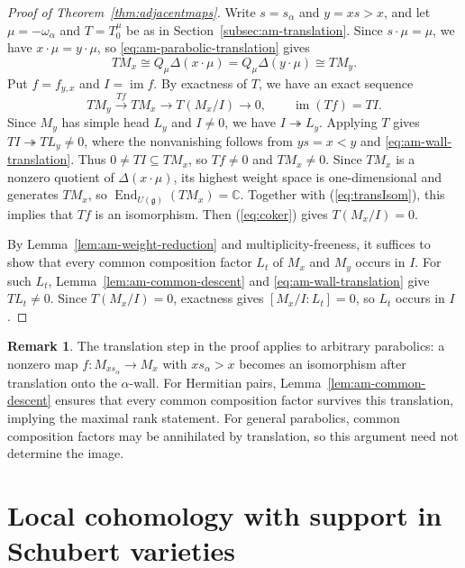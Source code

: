 \documentclass[12pt]{amsart}
\theoremstyle{definition}
\newtheorem{remark}[theorem]{Remark}
\numberwithin{equation}{section}
\newcommand{\g}{\mathfrak g}
\begin{document}
\begin{proof}[Proof of Theorem~\ref{thm:adjacentmaps}]
Write $s=s_\alpha$ and $y=xs>x$, and let $\mu=-\omega_\alpha$
and $T=T_0^\mu$ be as in Section~\ref{subsec:am-translation}.
Since $s\cdot\mu=\mu$, we have $x\cdot \mu=y\cdot \mu$, so \eqref{eq:am-parabolic-translation} gives
\begin{equation}\label{eq:transIsom}
 TM_x\cong Q_\mu\Delta(x\cdot\mu)
 =Q_\mu\Delta(y\cdot\mu)\cong TM_y.
\end{equation}
Put $f=f_{y,x}$ and $I=\operatorname{im}f$. By exactness of $T$,
we have an exact sequence
\begin{equation}\label{eq:coker}
TM_y\xrightarrow{Tf}TM_x\longrightarrow T(M_x/I)\longrightarrow0,
\qquad
\operatorname{im}(Tf)=TI.
\end{equation}
Since $M_y$ has simple head $L_y$ and $I\ne0$, we have
$I\twoheadrightarrow L_y$. Applying $T$ gives $TI\twoheadrightarrow TL_y\ne0$, where the nonvanishing follows from $ys=x<y$ and
\eqref{eq:am-wall-translation}. Thus $0\ne TI\subseteq TM_x$, so $Tf\ne0$ and $TM_x\ne0$.
Since $TM_x$ is a nonzero quotient of $\Delta(x\cdot\mu)$,
its highest weight space is one-dimensional and generates
$TM_x$, so $\operatorname{End}_{U(\g)}(TM_x)=\mathbb C$.
Together with (\ref{eq:transIsom}), this implies that $Tf$ is an
isomorphism. Then (\ref{eq:coker}) gives $T(M_x/I)=0$.

By Lemma~\ref{lem:am-weight-reduction} and multiplicity-freeness,
it suffices to show that every common composition factor $L_t$
of $M_x$ and $M_y$ occurs in $I$.
For such $L_t$, Lemma~\ref{lem:am-common-descent} and
\eqref{eq:am-wall-translation} give $TL_t\ne0$.
Since $T(M_x/I)=0$, exactness gives $[M_x/I:L_t]=0$,
so $L_t$ occurs in $I$.
\end{proof}

\begin{remark}
The translation step in the proof applies to arbitrary parabolics:
a nonzero map $f:M_{xs_\alpha}\to M_x$ with $xs_\alpha>x$
becomes an isomorphism after translation onto the $\alpha$-wall.
For Hermitian pairs, Lemma~\ref{lem:am-common-descent} ensures
that every common composition factor survives this translation, implying the maximal rank statement. For general parabolics, common composition factors
may be annihilated by translation, so this argument 
need not determine the image.
\end{remark}


\section{Local cohomology with support in Schubert varieties}\label{sec:local-cohomology}
\end{document}
